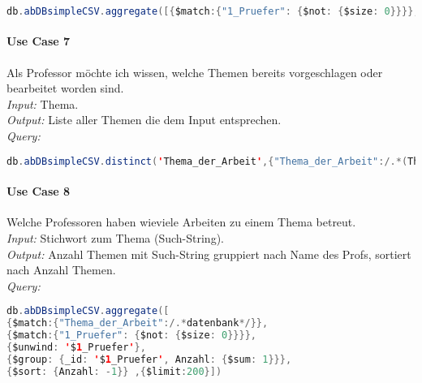 \begin{lstlisting}[caption={Query zu Use Case 6},language=java,captionpos=t,numbers=none, numberstyle=\tiny,breaklines=true]
db.abDBsimpleCSV.aggregate([{$match:{"1_Pruefer": {$not: {$size: 0}}}},{$unwind: '$1_Pruefer'}, {$group: {_id: '$1_Pruefer', Anzahl: {$sum: 1}}}, {$match: {Anzahl: {$gte: 2}}},{$sort: {Anzahl: -1}} ,{$limit:200}])
\end{lstlisting}\label{lst:query6}

\paragraph{Use Case 7} Als Professor möchte ich wissen, welche Themen bereits vorgeschlagen oder bearbeitet worden sind. \\
\emph{Input:} Thema. \\
\emph{Output:} Liste aller Themen die dem Input entsprechen. \\
\emph{Query:}

\begin{lstlisting}[caption={Query zu Use Case 7},language=java,captionpos=t,numbers=none, numberstyle=\tiny,breaklines=true]
db.abDBsimpleCSV.distinct('Thema_der_Arbeit',{"Thema_der_Arbeit":/.*(Thema).*/})
\end{lstlisting}\label{lst:query7}

\paragraph{Use Case 8} Welche Professoren haben wieviele Arbeiten zu einem Thema betreut. \\
\emph{Input:} Stichwort zum Thema (Such-String). \\
\emph{Output:} Anzahl Themen mit Such-String gruppiert nach Name des Profs, sortiert nach Anzahl Themen. \\
\emph{Query:}

\begin{lstlisting}[caption={Query zu Use Case 8},language=java,captionpos=t,numbers=none, numberstyle=\tiny,breaklines=true]
db.abDBsimpleCSV.aggregate([
{$match:{"Thema_der_Arbeit":/.*datenbank*/}},
{$match:{"1_Pruefer": {$not: {$size: 0}}}},
{$unwind: '$1_Pruefer'},
{$group: {_id: '$1_Pruefer', Anzahl: {$sum: 1}}},
{$sort: {Anzahl: -1}} ,{$limit:200}])
\end{lstlisting}\label{lst:query8}